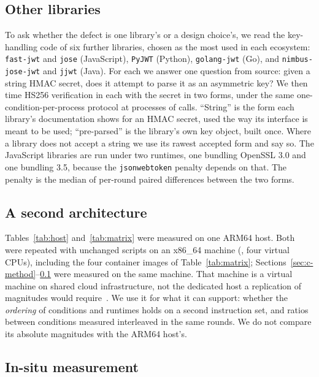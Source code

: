\documentclass[pdflatex,sn-basic,twocolumn]{sn-jnl}%
\newcommand{\LibraryName}{\texttt{jsonwebtoken}}
\begin{document}
\subsection{Other libraries}\label{sec:xlib-method}

To ask whether the defect is one library's or a design choice's, we read the
key-handling code of six further libraries, chosen as the most used in each
ecosystem: \texttt{fast-jwt} and \texttt{jose} (JavaScript), \texttt{PyJWT}
(Python), \texttt{golang-jwt} (Go), and \texttt{nimbus-jose-jwt} and
\texttt{jjwt} (Java). For each we answer one question from source: given a
string HMAC secret, does it attempt to parse it as an asymmetric key? We then
time HS256 verification in each with the secret in two forms, under the same
one-condition-per-process protocol at \XlibInvocations{} processes of
\XlibCallsPerInvocation{} calls. ``String'' is the form each library's
documentation shows for an HMAC secret, used the way its interface is meant to
be used; ``pre-parsed'' is the library's own key object, built once. Where a
library does not accept a string we use its rawest accepted form and say so.
The JavaScript libraries are run under two runtimes, one bundling OpenSSL 3.0
and one bundling 3.5, because the \LibraryName{} penalty depends on that. The
penalty is the median of per-round paired differences between the two forms.

\subsection{A second architecture}\label{sec:arch-method}

Tables~\ref{tab:host} and~\ref{tab:matrix} were measured on one ARM64 host.
Both were repeated with unchanged scripts on an x86\_64 machine (\ExcCpuModel,
four virtual CPUs), including the four container images of
Table~\ref{tab:matrix}; Sections~\ref{sec:c-method}--\ref{sec:xlib-method}
were measured on the same machine. That machine is a virtual machine on shared
cloud infrastructure, not the dedicated host a replication of magnitudes would
require~\citep{laaber2019cloud,leitner2016patterns}. We use it for what it can
support: whether the \emph{ordering} of conditions and runtimes holds on a
second instruction set, and ratios between conditions measured interleaved in
the same rounds. We do not compare its absolute magnitudes with the ARM64
host's.

\subsection{In-situ measurement}\label{sec:insitu-method}
\end{document}
